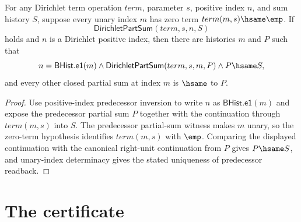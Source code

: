 \begin{theorem}
\label{thm:lfunction-dirichlet-partsum-zero-terms-positive-previous-readback}
For any Dirichlet term operation $term$, parameter $s$, positive index $n$,
and sum history $S$, suppose every unary index $m$ has zero term
$term(m,s)\hsame\emp$. If
$$
\mathsf{DirichletPartSum}(term,s,n,S)
$$
holds and $n$ is a Dirichlet positive index, then there are histories $m$ and
$P$ such that
$$
n=\mathsf{BHist.e1}(m)\land
\mathsf{DirichletPartSum}(term,s,m,P)\land
P\hsame S,
$$
and every other closed partial sum at index $m$ is $\hsame$ to $P$.
\end{theorem}
\begin{proof}
Use positive-index predecessor inversion to write $n$ as
$\mathsf{BHist.e1}(m)$ and expose the predecessor partial sum $P$ together
with the continuation through $term(m,s)$ into $S$. The predecessor partial-sum
witness makes $m$ unary, so the zero-term hypothesis identifies $term(m,s)$
with $\emp$. Comparing the displayed continuation with the canonical right-unit
continuation from $P$ gives $P\hsame S$, and unary-index determinacy gives the
stated uniqueness of predecessor readback.
\end{proof}

\section{The certificate}
\label{sec:lfunction-certificate}

